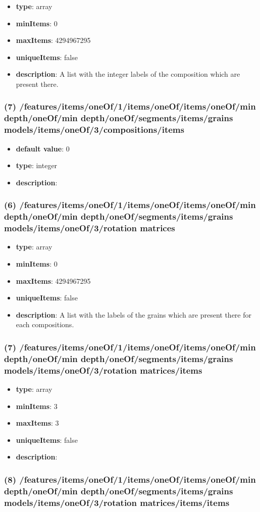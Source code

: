\begin{itemize}[leftmargin=6em]\item {\bf type}: array
\item {\bf minItems}: 0
\item {\bf maxItems}: 4294967295
\item {\bf uniqueItems}: false
\item {\bf description}: A list with the integer labels of the composition which are present there.
\end{itemize}\subsubsection{(7) /features/items/oneOf/1/items/oneOf/items/oneOf/min depth/oneOf/min depth/oneOf/segments/items/grains models/items/oneOf/3/compositions/items}
\begin{itemize}[leftmargin=7em]\item {\bf default value}: 0
\item {\bf type}: integer
\item {\bf description}: 
\end{itemize}\subsubsection{(6) /features/items/oneOf/1/items/oneOf/items/oneOf/min depth/oneOf/min depth/oneOf/segments/items/grains models/items/oneOf/3/rotation matrices}
\begin{itemize}[leftmargin=6em]\item {\bf type}: array
\item {\bf minItems}: 0
\item {\bf maxItems}: 4294967295
\item {\bf uniqueItems}: false
\item {\bf description}: A list with the labels of the grains which are present there for each compositions.
\end{itemize}\subsubsection{(7) /features/items/oneOf/1/items/oneOf/items/oneOf/min depth/oneOf/min depth/oneOf/segments/items/grains models/items/oneOf/3/rotation matrices/items}
\begin{itemize}[leftmargin=7em]\item {\bf type}: array
\item {\bf minItems}: 3
\item {\bf maxItems}: 3
\item {\bf uniqueItems}: false
\item {\bf description}: 
\end{itemize}\subsubsection{(8) /features/items/oneOf/1/items/oneOf/items/oneOf/min depth/oneOf/min depth/oneOf/segments/items/grains models/items/oneOf/3/rotation matrices/items/items}
